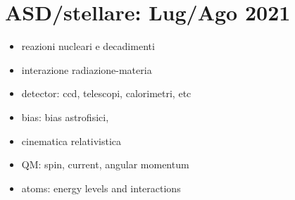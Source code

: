 \documentclass[main.tex]{subfiles}
\begin{document}
\part{ASD/stellare: Lug/Ago 2021}

\begin{itemize}
    \item reazioni nucleari e decadimenti
    \item interazione radiazione-materia
    \item detector: ccd, telescopi, calorimetri, etc
    \item bias: bias astrofisici,
    \item cinematica relativistica
    \item QM: spin, current, angular momentum
    \item atoms: energy levels and interactions
\end{itemize}
\end{document}
